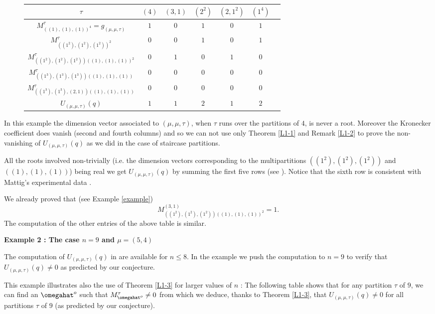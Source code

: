 \begin{figure}[h]
	\centering
	\begin{tabular}{|c|c|c|c|c|c|c|}
		\hline
		$\tau$ &$(4)$ 
		& $(3,1)$ 
		&$(2^2)$
		&$(2,1^2)$
		&$(1^4)$   \\
		\hline
		$M_{((1),(1),(1))^4}^{\tau}=g_{(\mu,\mu,\tau)}$ & $1$ &$0$&$1$&$0$&$1$\\ 
		\hline
		$M_{((1^2),(1^2),(1^2))^2}^\tau$ &$0$&$0$&$1$&$0$&$1$\\
		\hline
		$M_{((1^2),(1^2),(1^2))((1),(1),(1))^2}^\tau$ & $0$ &$1$&$0$&$1$&$0$\\ 
		\hline
		$M_{((1^3),(1^3),(1^3))((1),(1),(1))}^\tau$ & $0$ &$0$&$0$&$0$&$0$\\ 
		\hline
		$M_{((1^3),(1^3),(2,1))((1),(1),(1))}^\tau$ & $0$ &$0$&$0$&$0$&$0$\\ 
		\hline
		\hline
		$U_{(\mu,\mu,\tau)}(q)$&$1$&$1$&$2$&$1$&$2$\\
		\hline
	\end{tabular}
\end{figure}

\begin{rema}In this example the dimension vector associated to $(\mu,\mu,\tau)$, when $\tau$ runs over the partitions of $4$, is never a root. Moreover the Kronecker coefficient does vanish (second and fourth columns) and so we can not  use only Theorem \ref{L1-1} and Remark \ref{L1-2} to prove the non-vanishing of $U_{(\mu,\mu,\tau)}(q)$ as  we did in the case of staircase partitions.
\end{rema}

All the roots involved non-trivially (i.e. the dimension vectors corresponding to the multipartitions $((1^2),(1^2),(1^2))$ and $((1),(1),(1))$) being real we get $U_{(\mu,\mu,\tau)}(q)$  by summing the first five rows (see  \cite[Formula (17), Proposition 27]{L1}). Notice that the sixth row  is consistent with Mattig's experimental data \cite{Lu}.

We already proved that (see Example \ref{example})
$$
M_{((1^2),(1^2),(1^2))((1),(1),(1))^2}^{(3,1)}=1.
$$
The computation of the other entries of the above table is similar.


{\bf Example 2 : The case $n=9$ and $\mu=(5,4)$}


The computation of $U_{(\mu,\mu,\tau)}(q)$ in \cite{Lu} are available for $n\leq 8$.  In the example we push the computation to $n=9$ to verify that $U_{(\mu,\mu,\tau)}(q)\neq 0$ as predicted by our conjecture. 

This example illustrates also the use of Theorem \ref{L1-3} for larger values of $n$ : The following table shows that for any partition $\tau$ of $9$, we can find an $\omegahat^o$ such that $M_{\omegahat^o}^\tau\neq 0$ from which we deduce, thanks to Theorem \ref{L1-3}, that  $U_{(\mu,\mu,\tau)}(q)\neq 0$ for all partitions $\tau$ of $9$ (as predicted by our conjecture). 


